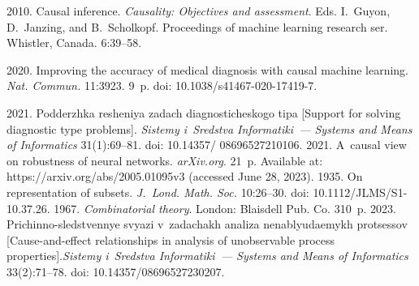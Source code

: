   \begin{multicols}{2}

\renewcommand{\bibname}{\protect\rmfamily References}

{\small\frenchspacing
 {%
 \begin{thebibliography}{9} 

 2010. Causal inference. \textit{Causality: Objectives and 
assessment}. Eds. I.~Guyon, D.~Janzing, and B.~Scholkopf. Proceedings of machine learning 
research ser. Whistler, Canada. 6:39--58.

 2020. Improving the accuracy of medical diagnosis 
with causal machine learning. \textit{Nat. Commun.} 11:3923. 9~p. doi:  
10.1038/s41467-020-17419-7.

 2021. Pod\-derzh\-ka 
re\-she\-niya za\-dach diag\-no\-sti\-che\-sko\-go ti\-pa [Support for solving diagnostic type problems]. 
\textit{Sis\-te\-my i~Sredstva Informatiki~--- Systems and Means of Informatics} 31(1):69--81. doi: 
10.14357/ 08696527210106.
 2021. A~causal view on robustness of neural networks. 
\textit{arXiv.org}. 21~p. Available at:  https://arxiv.org/abs/2005.01095v3 (accessed June 28, 2023).
 1935. On representation of subsets. \textit{J.~Lond. Math. Soc.} 10:26--30. doi: 
10.1112/JLMS/S1-10.37.26.
 1967. \textit{Combinatorial theory}. London: Blaisdell Pub. Co. 310~p.
 2023.  Prichinno-sledstvennye svya\-zi v~za\-da\-chakh ana\-li\-za 
ne\-nablyuda\-emykh pro\-tses\-sov [Cause-and-effect relationships in analysis of unobservable process 
properties].\linebreak \textit{Sis\-te\-my i~Sredstva Informatiki~--- Systems and Means of Informatics} 
33(2):71--78. doi: 10.14357/08696527230207.
\end{thebibliography}

 }
 }

\end{multicols}

\vspace*{-6pt}

